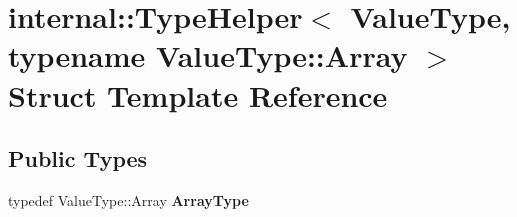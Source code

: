 \hypertarget{structinternal_1_1TypeHelper_3_01ValueType_00_01typename_01ValueType_1_1Array_01_4}{}\section{internal\+:\+:Type\+Helper$<$ Value\+Type, typename Value\+Type\+:\+:Array $>$ Struct Template Reference}
\label{structinternal_1_1TypeHelper_3_01ValueType_00_01typename_01ValueType_1_1Array_01_4}
\subsection*{Public Types}
\begin{DoxyCompactItemize}
\item 
typedef Value\+Type\+::\+Array {\bfseries Array\+Type}\hypertarget{structinternal_1_1TypeHelper_3_01ValueType_00_01typename_01ValueType_1_1Array_01_4_a8f384dc96b6104e85b956ec5f7386434}{}\label{structinternal_1_1TypeHelper_3_01ValueType_00_01typename_01ValueType_1_1Array_01_4_a8f384dc96b6104e85b956ec5f7386434}

\end{DoxyCompactItemize}
